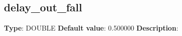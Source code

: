 \subsection*{delay_out_fall}
\textbf{Type}: DOUBLE\newline
\textbf{Default value}: 0.500000\newline
\textbf{Description}: